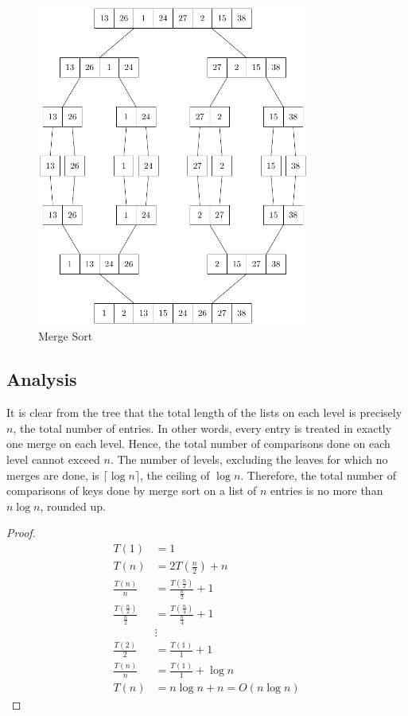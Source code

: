 \begin{minipage}{0.6\textwidth}
  \begin{figure}[H]
    \centering
    \includegraphics[width=0.8\textwidth]{Figure/MergeSort.pdf}
    \caption*{Merge Sort}
  \end{figure}
\end{minipage}

\subsection{Analysis}
It is clear from the tree that the total length of the lists on each level is precisely \(n\), the total number of entries. In other words, every entry is treated in exactly one merge on each level. Hence, the total number of comparisons done on each level cannot exceed \(n\). The number of levels, excluding the leaves for which no merges are done, is \(\lceil \log n \rceil\), the ceiling of \(\log n\). Therefore, the total number of comparisons of keys done by merge sort on a list of \(n\) entries is no more than \(n \log n\), rounded up.

\begin{proof}
\[
\begin{aligned}
  T(1) &= 1 \\
  T(n) &= 2T(\frac{n}{2}) + n \\
  \frac{T(n)}{n} &= \frac{T(\frac{n}{2})}{\frac{n}{2}} + 1 \\
  \frac{T(\frac{n}{2})}{\frac{n}{2}} &= \frac{T(\frac{n}{4})}{\frac{n}{4}} + 1 \\
  &\vdots \\
  \frac{T(2)}{2} &= \frac{T(1)}{1} + 1 \\
  \frac{T(n)}{n} &= \frac{T(1)}{1} + \log n \\
  T(n) &= n\log n + n = O(n\log n)
\end{aligned}
\]
\end{proof}


